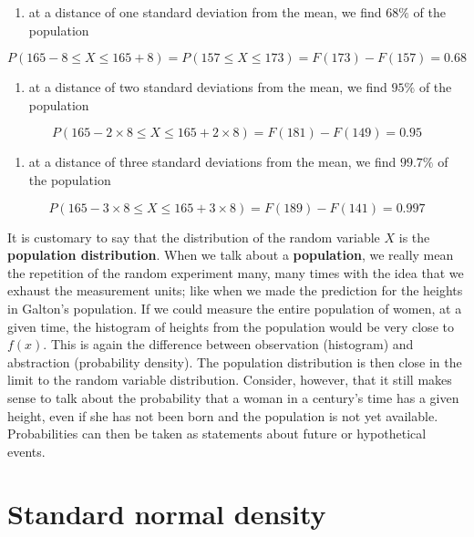 \documentclass[
]{book}
\providecommand{\tightlist}{%
  \setlength{\itemsep}{0pt}\setlength{\parskip}{0pt}}
\begin{document}
\begin{enumerate}
\def\labelenumi{\arabic{enumi})}
\tightlist
\item
  at a distance of one standard deviation from the mean, we find \(68\%\) of the population
\end{enumerate}

\[P(165-8 \leq X \leq 165+8)=P(157 \leq X \leq 173)=F(173)-F(157)=0.68\]

\begin{enumerate}
\def\labelenumi{\arabic{enumi})}
\setcounter{enumi}{1}
\tightlist
\item
  at a distance of two standard deviations from the mean, we find \(95\%\) of the population
\end{enumerate}

\[P(165-2 \times 8 \leq X \leq 165+2\times 8)=F(181)-F(149)=0.95\]

\begin{enumerate}
\def\labelenumi{\arabic{enumi})}
\setcounter{enumi}{2}
\tightlist
\item
  at a distance of three standard deviations from the mean, we find \(99.7\%\) of the population
\end{enumerate}

\[P(165-3 \times 8 \leq X \leq 165+3\times 8)=F(189)-F(141)=0.997\]

It is customary to say that the distribution of the random variable \(X\) is the \textbf{population distribution}. When we talk about a \textbf{population}, we really mean the repetition of the random experiment many, many times with the idea that we exhaust the measurement units; like when we made the prediction for the heights in Galton's population. If we could measure the entire population of women, at a given time, the histogram of heights from the population would be very close to \(f(x)\). This is again the difference between observation (histogram) and abstraction (probability density). The population distribution is then close in the limit to the random variable distribution. Consider, however, that it still makes sense to talk about the probability that a woman in a century's time has a given height, even if she has not been born and the population is not yet available. Probabilities can then be taken as statements about future or hypothetical events.

\hypertarget{standard-normal-density}{%
\section{Standard normal density}\label{standard-normal-density}}
\end{document}
